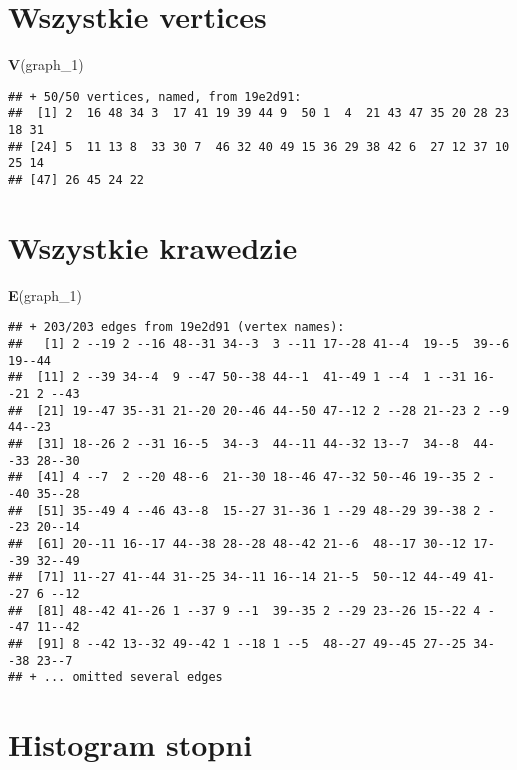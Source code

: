 \documentclass[]{article}
\newenvironment{Shaded}{\begin{snugshade}}{\end{snugshade}}
\newcommand{\KeywordTok}[1]{\textcolor[rgb]{0.13,0.29,0.53}{\textbf{#1}}}
\newcommand{\DecValTok}[1]{\textcolor[rgb]{0.00,0.00,0.81}{#1}}
\newcommand{\NormalTok}[1]{#1}
\begin{document}
\section{Wszystkie vertices}\label{wszystkie-vertices}

\begin{Shaded}
\begin{Highlighting}[]
\KeywordTok{V}\NormalTok{(graph_}\DecValTok{1}\NormalTok{)}
\end{Highlighting}
\end{Shaded}

\begin{verbatim}
## + 50/50 vertices, named, from 19e2d91:
##  [1] 2  16 48 34 3  17 41 19 39 44 9  50 1  4  21 43 47 35 20 28 23 18 31
## [24] 5  11 13 8  33 30 7  46 32 40 49 15 36 29 38 42 6  27 12 37 10 25 14
## [47] 26 45 24 22
\end{verbatim}

\section{Wszystkie krawedzie}\label{wszystkie-krawedzie}

\begin{Shaded}
\begin{Highlighting}[]
\KeywordTok{E}\NormalTok{(graph_}\DecValTok{1}\NormalTok{)}
\end{Highlighting}
\end{Shaded}

\begin{verbatim}
## + 203/203 edges from 19e2d91 (vertex names):
##   [1] 2 --19 2 --16 48--31 34--3  3 --11 17--28 41--4  19--5  39--6  19--44
##  [11] 2 --39 34--4  9 --47 50--38 44--1  41--49 1 --4  1 --31 16--21 2 --43
##  [21] 19--47 35--31 21--20 20--46 44--50 47--12 2 --28 21--23 2 --9  44--23
##  [31] 18--26 2 --31 16--5  34--3  44--11 44--32 13--7  34--8  44--33 28--30
##  [41] 4 --7  2 --20 48--6  21--30 18--46 47--32 50--46 19--35 2 --40 35--28
##  [51] 35--49 4 --46 43--8  15--27 31--36 1 --29 48--29 39--38 2 --23 20--14
##  [61] 20--11 16--17 44--38 28--28 48--42 21--6  48--17 30--12 17--39 32--49
##  [71] 11--27 41--44 31--25 34--11 16--14 21--5  50--12 44--49 41--27 6 --12
##  [81] 48--42 41--26 1 --37 9 --1  39--35 2 --29 23--26 15--22 4 --47 11--42
##  [91] 8 --42 13--32 49--42 1 --18 1 --5  48--27 49--45 27--25 34--38 23--7 
## + ... omitted several edges
\end{verbatim}

\section{Histogram stopni}\label{histogram-stopni-1}
\end{document}
